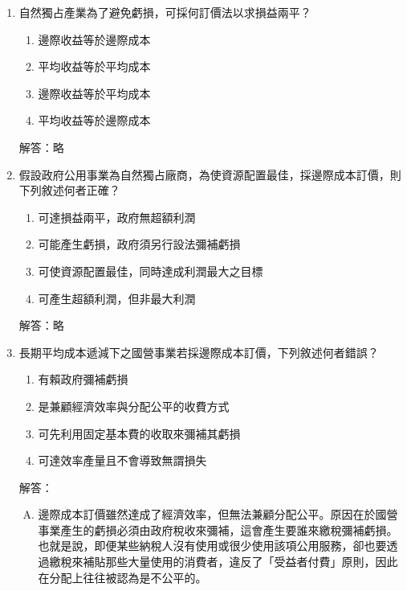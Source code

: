 \documentclass[12pt, a4paper]{article}
\begin{document}
\begin{enumerate}
    \item 自然獨占產業為了避免虧損，可採何訂價法以求損益兩平？
    \begin{enumerate}[label=\Alph*.]
        \item 邊際收益等於邊際成本
        \item 平均收益等於平均成本
        \item 邊際收益等於平均成本
        \item 平均收益等於邊際成本
    \end{enumerate}
    解答：略

    \item 假設政府公用事業為自然獨占廠商，為使資源配置最佳，採邊際成本訂價，則下列敘述何者正確？
    \begin{enumerate}[label=\Alph*.]
        \item 可達損益兩平，政府無超額利潤
        \item 可能產生虧損，政府須另行設法彌補虧損
        \item 可使資源配置最佳，同時達成利潤最大之目標
        \item 可產生超額利潤，但非最大利潤
    \end{enumerate}
    解答：略

    \item 長期平均成本遞減下之國營事業若採邊際成本訂價，下列敘述何者錯誤？
    \begin{enumerate}[label=\Alph*.]
        \item 有賴政府彌補虧損
        \item 是兼顧經濟效率與分配公平的收費方式
        \item 可先利用固定基本費的收取來彌補其虧損
        \item 可達效率產量且不會導致無謂損失
    \end{enumerate}
    解答：
    \begin{enumerate}[B.]
        \item 邊際成本訂價雖然達成了經濟效率，但無法兼顧分配公平。原因在於國營事業產生的虧損必須由政府稅收來彌補，這會產生要誰來繳稅彌補虧損。也就是說，即便某些納稅人沒有使用或很少使用該項公用服務，卻也要透過繳稅來補貼那些大量使用的消費者，違反了「受益者付費」原則，因此在分配上往往被認為是不公平的。
    \end{enumerate}


\end{enumerate}
\end{document}
